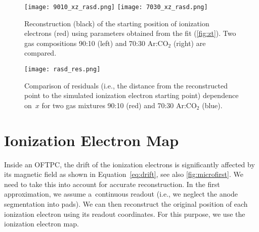 		\begin{figure}
			\centering
			\texttt{[image: 9010\_xz\_rasd.png]}
			\hfill
			\texttt{[image: 7030\_xz\_rasd.png]}
			\caption{Reconstruction (black) of the starting position of ionization electrons (red) using parameters obtained from the fit (\cref{fig:zt}). Two gas compositions 90:10 (left) and 70:30 Ar:CO$_2$ (right) are compared.}
			\label{fig:rasd_xz}
		\end{figure}
		
		\begin{figure}
			\centering
			\texttt{[image: rasd\_res.png]}
			\caption{Comparison of residuals (i.e., the distance from the reconstructed point to the simulated ionization electron starting point) dependence on~$x$ for two gas mixtures 90:10 (red) and 70:30 Ar:CO$_2$ (blue).}
			\label{fig:rasd_res}
		\end{figure}
	
	\section{Ionization Electron Map}
	\label{sec:map}
		Inside an \ac{OFTPC}, the drift of the ionization electrons is significantly affected by its magnetic field as shown in Equation~\ref{eq:drift}, see also \cref{fig:microfirst}. We need to take this into account for accurate reconstruction. In the first approximation, we assume a~continuous readout (i.e., we neglect the anode segmentation into pads). We can then reconstruct the original position of each ionization electron using its readout coordinates. For this purpose, we use the ionization electron map.
		
